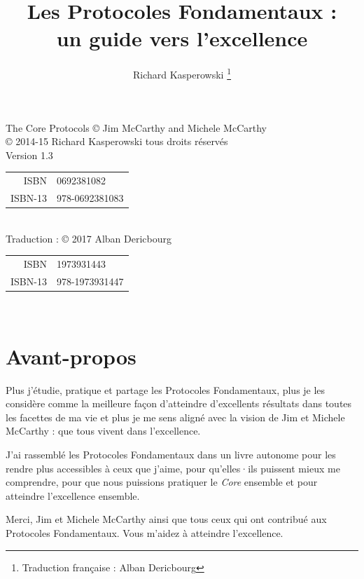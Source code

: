 \documentclass[11pt]{book}
\author{Richard Kasperowski \thanks{Traduction française : Alban Dericbourg}}
\title{Les Protocoles Fondamentaux :\\un guide vers l'excellence}
\begin{document}
\frontmatter

\maketitle

\vspace*{\fill}
\begin{center}
	The Core Protocols © Jim McCarthy and Michele McCarthy \\[1em]
	
	\copyright{} 2014-15 Richard Kasperowski tous droits réservés\\
	Version 1.3\\
	\begin{tabular}{rl}
		ISBN & 0692381082 \\
		ISBN-13 & 978-0692381083\\	
	\end{tabular}\\[1em]

	Traduction : \copyright{} 2017 Alban Dericbourg\\
	\begin{tabular}{rl}
		ISBN & 1973931443 \\
		ISBN-13 & 978-1973931447\\	
	\end{tabular}\\
\end{center}
\pagebreak

\setcounter{secnumdepth}{1}
\setcounter{tocdepth}{1}
\tableofcontents

\setlength{\parskip}{0.5em}

\chapter{Avant-propos}

Plus j'étudie, pratique et partage les Protocoles Fondamentaux, plus je les considère comme la meilleure façon d'atteindre
d'excellents résultats dans toutes les facettes de ma vie et plus je me sens aligné avec la vision de Jim et Michele McCarthy :
que tous vivent dans l'excellence.

J'ai rassemblé les Protocoles Fondamentaux dans un livre autonome pour les rendre plus accessibles à ceux que j'aime, pour
qu'elles·ils puissent mieux me comprendre, pour que nous puissions pratiquer le \emph{Core} ensemble et pour atteindre
l'excellence ensemble.

Merci, Jim et Michele McCarthy ainsi que tous ceux qui ont contribué aux Protocoles Fondamentaux. Vous m'aidez à atteindre
l'excellence.
\end{document}
